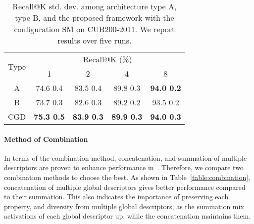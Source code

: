 \documentclass[10pt,twocolumn,letterpaper]{article}
\begin{document}
\begin{CJK}{UTF8}{mj}
\begin{table}[t!]
\begin{center}
\begin{adjustbox}{width=0.95\columnwidth,center}
\begin{tabular}{c|cccc}
\hline
\multirow{2}{*}{Type}   & \multicolumn{4}{c}{Recall@K (\%)} \\ \cline{2-5} 
                        & 1                     & 2                     & 4                     & 8                     \\
                       \hline\hline
A                       & 74.6  0.4	        & 83.5  0.4	        & 89.8  0.3	        & \textbf{94.0  0.2}   \\
B                       & 73.7  0.3	        & 82.6  0.3	        & 89.2  0.2	        & 93.5  0.2            \\
CGD                 & \textbf{75.3  0.5}	& \textbf{83.9  0.3}	& \textbf{89.9  0.3}	& \textbf{94.0  0.3}   \\ \hline
\end{tabular}
\end{adjustbox}
\end{center}
\caption{Recall@K  std. dev. among architecture type A, type B, and the proposed framework with the configuration SM on CUB200-2011.
We report results over five runs.}
\label{table:architecture_type}
\end{table}

\vspace{-4mm}
\paragraph{Method of Combination}
In terms of the combination method, concatenation, and summation of multiple descriptors are proven to enhance performance in~\cite{Kim_2018_ECCV, shen2017learning, suvisual, tolias2015particular, dai2018batch}.
Therefore, we compare two combination methods to choose the best.
As shown in Table~\ref{table:combination}, concatenation of multiple global descriptors gives better performance compared to their summation.
This also indicates the importance of preserving each property, and diversity from multiple global descriptors, as the summation mix activations of each global descriptor up, while the concatenation maintains them.


\end{CJK}
\end{document}
